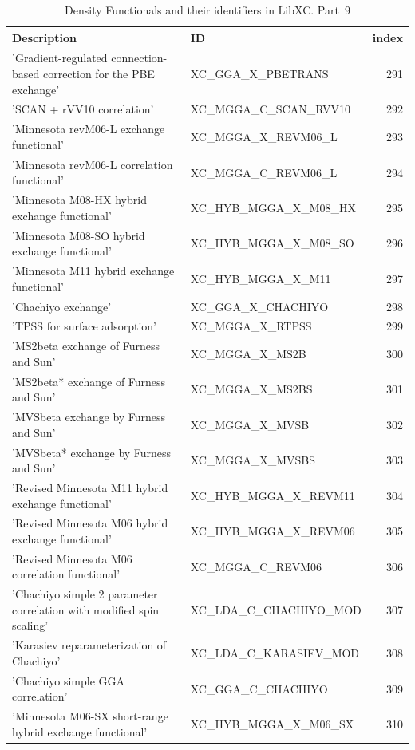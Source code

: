 \documentclass[final,12pt,makeidx,DIV=calc]{article}
\begin{document}
{{{\begin{table}[!h]
\caption{Density Functionals and their identifiers in LibXC. Part~9}
\begin{center}
\begin{tabular}{llr}
\hline
\hline
Description & ID & index\\
\hline
  'Gradient-regulated connection-based correction for the PBE exchange' & XC\_GGA\_X\_PBETRANS  &291\\
  'SCAN + rVV10 correlation' & XC\_MGGA\_C\_SCAN\_RVV10  &292\\
  'Minnesota revM06-L exchange functional' & XC\_MGGA\_X\_REVM06\_L  &293\\
  'Minnesota revM06-L correlation functional' & XC\_MGGA\_C\_REVM06\_L  &294\\
  'Minnesota M08-HX hybrid exchange functional' & XC\_HYB\_MGGA\_X\_M08\_HX  &295\\
  'Minnesota M08-SO hybrid exchange functional' & XC\_HYB\_MGGA\_X\_M08\_SO  &296\\
  'Minnesota M11 hybrid exchange functional' & XC\_HYB\_MGGA\_X\_M11  &297\\
  'Chachiyo exchange' & XC\_GGA\_X\_CHACHIYO  &298\\
  'TPSS for surface adsorption' & XC\_MGGA\_X\_RTPSS  &299\\
  'MS2beta exchange of Furness and Sun' & XC\_MGGA\_X\_MS2B  &300\\
  'MS2beta* exchange of Furness and Sun' & XC\_MGGA\_X\_MS2BS  &301\\
  'MVSbeta exchange by Furness and Sun' & XC\_MGGA\_X\_MVSB  &302\\
  'MVSbeta* exchange by Furness and Sun' & XC\_MGGA\_X\_MVSBS  &303\\
  'Revised Minnesota M11 hybrid exchange functional' & XC\_HYB\_MGGA\_X\_REVM11  &304\\
  'Revised Minnesota M06 hybrid exchange functional' & XC\_HYB\_MGGA\_X\_REVM06  &305\\
  'Revised Minnesota M06 correlation functional' & XC\_MGGA\_C\_REVM06  &306\\
  'Chachiyo simple 2 parameter correlation with modified spin scaling' & XC\_LDA\_C\_CHACHIYO\_MOD  &307\\
  'Karasiev reparameterization of Chachiyo' & XC\_LDA\_C\_KARASIEV\_MOD  &308\\
  'Chachiyo simple GGA correlation' & XC\_GGA\_C\_CHACHIYO  &309\\
  'Minnesota M06-SX short-range hybrid exchange functional' & XC\_HYB\_MGGA\_X\_M06\_SX  &310\\

\end{tabular}
\end{center}
\end{table}}}}
\end{document}

